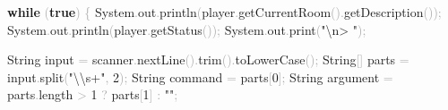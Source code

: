 \documentclass[
  justified,
  openright,
]{tufte-book}
\newcommand{\KeywordTok}[1]{\textcolor{CodeKeyword}{\textbf{#1}}}  %
\newcommand{\StringTok}[1]{\textcolor{CodeString}{#1}}              %
\newcommand{\CodeNumTok}[1]{\textcolor{CodeNumber}{#1}}             %
\newcommand{\CodeFuncTok}[1]{\textcolor{CodeKeyword}{#1}}           %
\newcommand{\OperatorTok}[1]{\textcolor{DarkGray}{#1}}              %
\newenvironment{Shaded}{%
  \begin{mdframed}[style=TufteCode]%
}{%
  \end{mdframed}%
}
\begin{document}
\begin{Shaded}
\begin{Highlighting}[]
        \KeywordTok{while} \OperatorTok{(}\KeywordTok{true}\OperatorTok{)} \OperatorTok{\{}
            System\OperatorTok{.}\CodeFuncTok{out}\OperatorTok{.}\CodeFuncTok{println}\OperatorTok{(}player\OperatorTok{.}\CodeFuncTok{getCurrentRoom}\OperatorTok{().}\CodeFuncTok{getDescription}\OperatorTok{());}
            System\OperatorTok{.}\CodeFuncTok{out}\OperatorTok{.}\CodeFuncTok{println}\OperatorTok{(}player\OperatorTok{.}\CodeFuncTok{getStatus}\OperatorTok{());}
            System\OperatorTok{.}\CodeFuncTok{out}\OperatorTok{.}\CodeFuncTok{print}\OperatorTok{(}\StringTok{"}\StringTok{\textbackslash{}n}\StringTok{\textgreater{} "}\OperatorTok{);}
 
            String input \OperatorTok{=} scanner\OperatorTok{.}\CodeFuncTok{nextLine}\OperatorTok{().}\CodeFuncTok{trim}\OperatorTok{().}\CodeFuncTok{toLowerCase}\OperatorTok{();}
            String\OperatorTok{[]} parts \OperatorTok{=} input\OperatorTok{.}\CodeFuncTok{split}\OperatorTok{(}\StringTok{"}\StringTok{\textbackslash{}\textbackslash{}}\StringTok{s+"}\OperatorTok{,} \CodeNumTok{2}\OperatorTok{);}
            String command \OperatorTok{=} parts\OperatorTok{[}\CodeNumTok{0}\OperatorTok{];}
            String argument \OperatorTok{=} parts\OperatorTok{.}\CodeFuncTok{length} \OperatorTok{\textgreater{}} \CodeNumTok{1} \OperatorTok{?} parts\OperatorTok{[}\CodeNumTok{1}\OperatorTok{]} \OperatorTok{:} \StringTok{""}\OperatorTok{;}
 

\end{Highlighting}
\end{Shaded}
\end{document}

